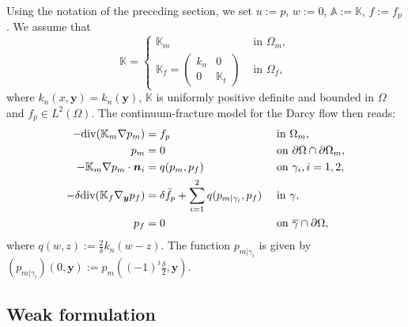 \documentclass[a4paper]{article}
\def\vc#1{\mathbf{\boldsymbol{#1}}}     %
\def\tn#1{{\mathbb{#1}}}    %
\def\div{{\rm div}}
\def\yy{{\vc y}}
\begin{document}
Using the notation of the preceding section, we set $u:=p$, $w:=0$, $\tn A:=\tn K$, $f:=f_p$.
We assume that
\[ \tn K = \begin{cases}\tn K_m & \mbox{ in }\Omega_m,\\ \tn K_f = \begin{pmatrix}k_n & 0\\0&\tn K_t\end{pmatrix} & \mbox{ in }\Omega_f,\end{cases} \]
where $k_n(x,\yy)=k_n(\yy)$, $\tn K$ is uniformly positive definite and bounded in $\Omega$ and $f_p\in L^2(\Omega)$.
The continuum-fracture model for the Darcy flow then reads:
\begin{subequations}
\label{eq:asymptotic_darcy}
\begin{align}
-\div(\tn K_m\nabla p_m) &= f_p &&\mbox{ in }\Omega_m,\\
p_m &= 0 &&\mbox{ on }\partial\Omega\cap\partial\Omega_m,\\
-\tn K_m\nabla p_m\cdot\vc n_i &= q(p_m,p_f) &&\mbox{ on }\gamma_i,i=1,2,\\
-\delta\div(\tn K_f\nabla_\yy p_f) &= \delta\bar f_p + \sum_{i=1}^2 q(p_{m|\gamma_i},p_f) &&\mbox{ in }\gamma,\\
p_f &= 0 &&\mbox{ on }\overline\gamma\cap\partial\Omega,
\end{align}
\end{subequations}
where $q(w,z):=\frac2\delta k_n(w-z)$.
The function $p_{m|\gamma_i}$ is given by $(p_{m|\gamma_i})(0,\yy):=p_m((-1)^i\frac\delta2,\yy)$.



\subsection{Weak formulation}
\end{document}
